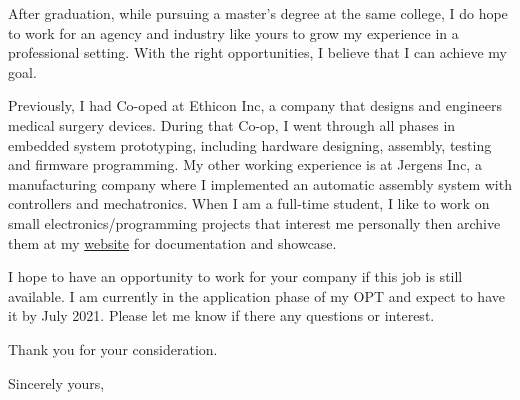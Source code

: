 \documentclass[11pt]{letter} %
\begin{document}
\begin{letter}
After graduation, while pursuing a master’s degree at the same college, I do hope to work for an agency and industry like yours to grow my experience in a professional setting. With the right opportunities, I believe that I can achieve my goal.

Previously, I had Co-oped at Ethicon Inc, a company that designs and engineers medical surgery devices. During that Co-op, I went through all phases in embedded system prototyping, including hardware designing, assembly, testing and firmware programming. My other working experience is at Jergens Inc, a manufacturing company where I implemented an automatic assembly system with controllers and mechatronics. When I am a full-time student, I like to work on small electronics/programming projects that interest me personally then archive them at my \href{https://liu2z2.github.io/}{website} for documentation and showcase. 

I hope to have an opportunity to work for your company if this job is still available. I am currently in the application phase of my OPT and expect to have it by July 2021. Please let me know if there any questions or interest. 

Thank you for your consideration.

\closing{Sincerely yours,}




\end{letter}
\end{document}
